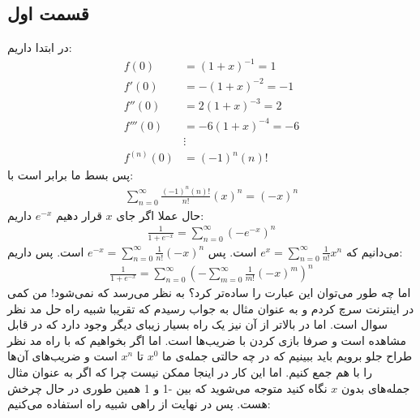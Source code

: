 \documentclass[]{article}
\begin{document}
\subsection*{قسمت اول}
در ابتدا داریم:
\begin{align*}
    f(0) &= (1 + x)^{-1} = 1\\
    f'(0) &= -(1 + x)^{-2} = -1\\
    f''(0) &= 2(1 + x)^{-3} = 2\\
    f'''(0) &= -6(1 + x)^{-4} = -6\\
    &\vdots\\
    f^{(n)}(0) &= (-1)^{n} (n)!
\end{align*}
پس بسط ما برابر است با:
\begin{gather*}
    \sum_{n=0}^{\infty} \frac{(-1)^{n} (n)!}{n!}(x)^n = (-x)^n
\end{gather*}
حال عملا اگر جای
$x$ قرار دهیم $e^{-x}$
داریم:
\begin{gather*}
    \frac{1}{1+e^{-x}} = \boxed{\sum_{n=0}^{\infty} (-e^{-x})^n}
\end{gather*}
می‌دانیم که
$e^x = \sum_{n=0}^{\infty} \frac{1}{n!}x^n$
است. پس
$e^{-x} = \sum_{n=0}^{\infty} \frac{1}{n!}(-x)^n$
است. پس داریم:
\begin{gather*}
    \frac{1}{1+e^{-x}} = \sum_{n=0}^{\infty} (- \sum_{m=0}^{\infty} \frac{1}{m!}(-x)^m)^n
\end{gather*}
اما چه طور می‌توان این عبارت را ساده‌تر کرد؟ به نظر می‌رسد که نمی‌شود! من کمی در اینترنت سرچ کردم
و به عنوان مثال به
جواب رسیدم که تقریبا شبیه راه حل مد نظر سوال است. اما در بالاتر از آن نیز یک راه بسیار زیبای دیگر وجود
دارد که در
قابل مشاهده است و صرفا بازی کردن با ضریب‌ها است. اما اگر بخواهیم که با راه مد نظر طراح جلو برویم
باید ببینیم که در چه حالتی جمله‌ی ما
$x^0$
تا
$x^n$
است و ضریب‌های آن‌ها را با هم جمع کنیم. اما این کار در اینجا ممکن نیست چرا که اگر به عنوان مثال
جمله‌های بدون
$x$
نگاه کنید متوجه می‌شوید که بین -1 و 1 همین طوری در حال چرخش هست. پس در نهایت از راهی شبیه راه
استفاده می‌کنیم:
\end{document}
